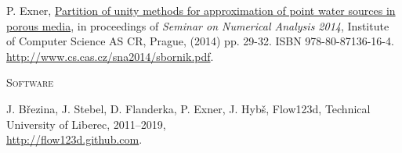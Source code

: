 \documentclass[bibliography=totocnumbered,dvipsnames,FM,Dis, EN]{tulthesis_autoreferat}
\begin{document}
\begin{itemize}[label={}, leftmargin=*]
{\item
P. Exner, \href{http://www.cs.cas.cz/sna2014/sbornik.pdf}{Partition of unity methods for approximation of point water sources in porous media},
in proceedings of \emph{Seminar on Numerical Analysis 2014}, Institute of Computer Science AS CR, Prague, (2014) pp. 29-32. ISBN 978-80-87136-16-4.\\
\url{http://www.cs.cas.cz/sna2014/sbornik.pdf}.
}
\end{itemize}
%
\vspace{0.5cm}
%
{\noindent\large\textsc{Software}}
\begin{itemize}[label={}, leftmargin=*]
{\small
\item
J. B{\v r}ezina, J. Stebel, D. Flanderka, P. Exner, J. Hyb{\v s}, Flow123d, 
Technical University of Liberec, 2011--2019, \\
\href{http://flow123d.github.com}{http://flow123d.github.com}.
}
\end{itemize}
\end{document}
